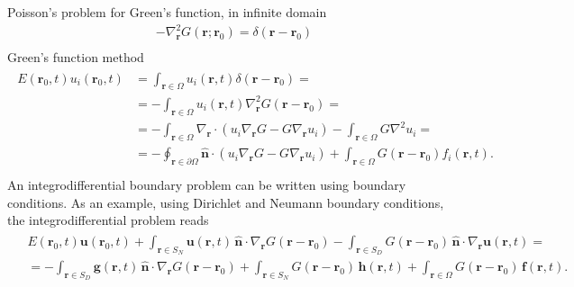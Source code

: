 \documentclass[letterpaper,10pt,english]{jupyterBook}
\begin{document}
\sphinxAtStartPar
Poisson’s problem for Green’s function, in infinite domain
\begin{equation*}
\begin{split}
  - \nabla_{\mathbf{r}}^2 G(\mathbf{r}; \mathbf{r}_0) = \delta(\mathbf{r} - \mathbf{r}_0) \\
\end{split}
\end{equation*}
\sphinxAtStartPar
Green’s function method
\begin{equation*}
\begin{split}\begin{aligned}
  E(\mathbf{r}_0, t) u_i(\mathbf{r}_0, t) 
  & =   \int_{\mathbf{r} \in \Omega} u_i(\mathbf{r},t) \delta(\mathbf{r}-\mathbf{r}_0) = \\
  & = - \int_{\mathbf{r} \in \Omega} u_i(\mathbf{r},t) \nabla_{\mathbf{r}}^2 G(\mathbf{r}-\mathbf{r}_0) = \\
  & = - \int_{\mathbf{r} \in \Omega} \nabla_{\mathbf{r}} \cdot ( u_i \nabla_{\mathbf{r}} G - G \nabla_{\mathbf{r}} u_i) - \int_{\mathbf{r} \in \Omega} G \nabla^2 u_i= \\
  & = - \oint_{\mathbf{r} \in \partial \Omega} \hat{\mathbf{n}} \cdot ( u_i \nabla_{\mathbf{r}} G - G \nabla_{\mathbf{r}} u_i) + \int_{\mathbf{r} \in \Omega} G(\mathbf{r}-\mathbf{r}_0) f_i(\mathbf{r}, t) . \\
\end{aligned}\end{split}
\end{equation*}
\sphinxAtStartPar
An integro\sphinxhyphen{}differential boundary problem can be written using boundary conditions. As an example, using Dirichlet and Neumann boundary conditions, the integro\sphinxhyphen{}differential problem reads
\begin{equation*}
\begin{split}\begin{aligned}
&  E(\mathbf{r}_0, t) \mathbf{u}(\mathbf{r}_0, t) 
+ \int_{\mathbf{r} \in S_N} \mathbf{u}(\mathbf{r},t) \, \hat{\mathbf{n}} \cdot \nabla_{\mathbf{r}} G(\mathbf{r}-\mathbf{r}_0)
- \int_{\mathbf{r} \in S_D} G(\mathbf{r}-\mathbf{r}_0) \, \hat{\mathbf{n}} \cdot \nabla_{\mathbf{r}} \mathbf{u}(\mathbf{r},t) = \\ 
& =
- \int_{\mathbf{r} \in S_D} \mathbf{g}(\mathbf{r},t) \, \hat{\mathbf{n}} \cdot \nabla_{\mathbf{r}} G(\mathbf{r}-\mathbf{r}_0)
+ \int_{\mathbf{r} \in S_N} G(\mathbf{r}-\mathbf{r}_0) \, \mathbf{h}(\mathbf{r},t)  
+ \int_{\mathbf{r} \in \Omega} G(\mathbf{r}-\mathbf{r}_0) \, \mathbf{f}(\mathbf{r}, t) . \\
\end{aligned}\end{split}
\end{equation*}
\end{document}

